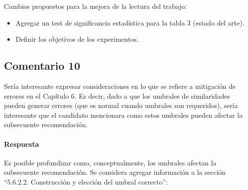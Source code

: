 \bigskip

Cambios propuestos para la mejora de la lectura del trabajo:
\begin{itemize}
	\item Agregar un test de significancia estadística para la tabla 3 (estado del arte).
	\item Definir los objetivos de los experimentos.
\end{itemize}

\subsection*{Comentario 10}
Sería interesante expresar consideraciones en lo que se refiere a mitigación de errores en el Capítulo 6. Es decir, dado a que los umbrales de similaridades pueden generar errores (que es normal cuando umbrales son requeridos), sería interesante que el candidato mencionara como estos umbrales pueden afectar la subsecuente recomendación.

\paragraph*{Respuesta}
Es posible profundizar como, conceptualmente, los umbrales afectan la subsecuente recomendación. Se considera agregar información a la sección ``5.6.2.2. Construcción y elección del umbral correcto'':

